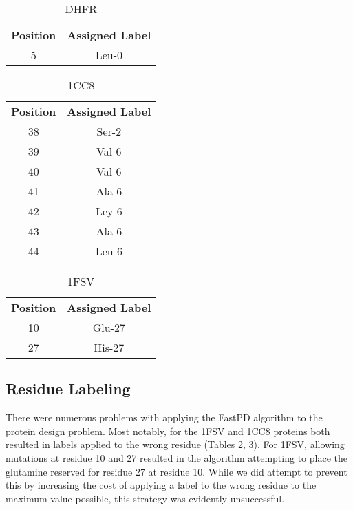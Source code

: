 \documentclass[11pt]{article}
\begin{document}
	\begin{table}[h]
	\centering
	\caption{DHFR}
	\label{dhfr}
	\begin{tabular}{@{}cc@{}}
	\toprule
	\textbf{Position} & \textbf{Assigned Label} \\
	5        & Leu-0          \\ \bottomrule
	\end{tabular}
	\end{table}
	\begin{table}[t]
	\centering
	\caption{1CC8}
	\label{1cc8}
	\begin{tabular}{@{}cc@{}}
	\toprule
	\textbf{Position} & \textbf{Assigned Label} \\
	38        & Ser-2          \\
	39        & Val-6          \\
	40        & Val-6          \\
	41        & Ala-6          \\
	42        & Ley-6          \\
	43        & Ala-6          \\
	44        & Leu-6          \\ \bottomrule
	\end{tabular}
	\end{table}
	\begin{table}[h]
	\centering
	\caption{1FSV}
	\begin{tabular}{@{}cc@{}}
	\toprule
	\textbf{Position} & \textbf{Assigned Label} \\
	10       & Glu-27         \\
	27       & His-27         \\ \bottomrule
	\end{tabular}
	\label{1fsv}
	\end{table}
	
	\subsection{Residue Labeling}
	There were numerous problems with applying the FastPD algorithm to the protein
	design problem. Most notably, for the 1FSV and 1CC8 proteins both resulted in
	labels applied to the wrong residue (Tables \ref{1cc8}, \ref{1fsv}). For 1FSV,
	allowing mutations at residue 10 and 27 resulted in the algorithm attempting to
	place the glutamine reserved for residue 27 at residue 10. While we did attempt to
	prevent this by increasing the cost of applying a label to the wrong residue 
	to the maximum value possible, this strategy was evidently unsuccessful. 
	
\end{document}
